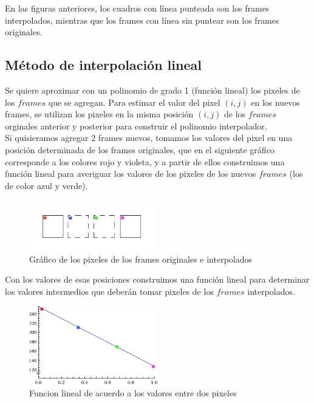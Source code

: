 En las figuras anteriores, los cuadros con línea punteada son los frames interpolados, mientras que los frames con línea sin puntear son los frames originales.

\subsection{Método de interpolación lineal}
Se quiere aproximar con un polinomio de grado 1 (función lineal) los pixeles de los $frames$ que se agregan. Para estimar el valor del pixel $(i,j)$ en los nuevos frames, se utilizan los pixeles en la
misma posición $(i,j)$ de los $frames$ orginales anterior y posterior para construir el polinomio interpolador. \\

Si quisieramos agregar 2 frames nuevos, tomamos los valores del pixel en una posición determinada de los frames originales, que en el siguiente gráfico corresponde a los colores rojo y violeta, y a partir de ellos construimos una función lineal para averiguar los valores de los pixeles de los nuevos $frames$ (los de color azul y verde).


\begin{figure}[h!]
  \caption{Gráfico de los pixeles de los frames originales e interpolados}
  \centering
    \includegraphics[width=0.5\textwidth]{imagenes/linealFrames.png}
\end{figure}

Con los valores de esas posiciones construimos una función lineal para determinar los valores intermedios que deberán tomar pixeles de los $frames$ interpolados.

\begin{figure}[h!]
  \caption{Funcion lineal de acuerdo a los valores entre dos pixeles}
  \centering
    \includegraphics[width=0.5\textwidth]{imagenes/lineal2.png}
\end{figure}


